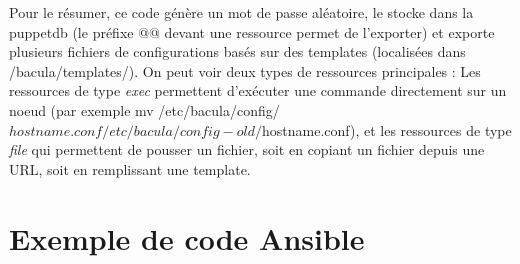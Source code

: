 \documentclass[14 pt]{extreport}
\begin{document}
Pour le résumer, ce code génère un mot de passe aléatoire, le stocke dans la puppetdb (le préfixe @@ devant une ressource permet de l'exporter) et exporte plusieurs fichiers de configurations basés sur des templates (localisées dans /bacula/templates/). On peut voir deux types de ressources principales : Les ressources de type \emph{exec} permettent d'exécuter une commande directement sur un noeud (par exemple mv /etc/bacula/config/${hostname}.conf /etc/bacula/config-old/${hostname}.conf), et les ressources de type \emph{file} qui permettent de pousser un fichier, soit en copiant un fichier depuis une URL, soit en remplissant une template.

\chapter{Exemple de code Ansible}
\end{document}
